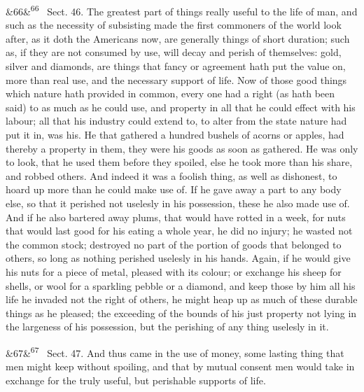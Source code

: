 \documentclass[12pt]{article}
\newcommand{\para}[1][]{\par\noindent\ifx&#1&\else\textsuperscript{\footnotesize #1}~\fi}
\begin{document}
\para[66] Sect. 46. The greatest part of things really useful to the life of man, and such as the necessity of subsisting made the first commoners of the world look after, as it doth the Americans now, are generally things of short duration; such as, if they are not consumed by use, will decay and perish of themselves: gold, silver and diamonds, are things that fancy or agreement hath put the value on, more than real use, and the necessary support of life. Now of those good things which nature hath provided in common, every one had a right (as hath been said) to as much as he could use, and property in all that he could effect with his labour; all that his industry could extend to, to alter from the state nature had put it in, was his. He that gathered a hundred bushels of acorns or apples, had thereby a property in them, they were his goods as soon as gathered. He was only to look, that he used them before they spoiled, else he took more than his share, and robbed others. And indeed it was a foolish thing, as well as dishonest, to hoard up more than he could make use of. If he gave away a part to any body else, so that it perished not uselesly in his possession, these he also made use of. And if he also bartered away plums, that would have rotted in a week, for nuts that would last good for his eating a whole year, he did no injury; he wasted not the common stock; destroyed no part of the portion of goods that belonged to others, so long as nothing perished uselesly in his hands. Again, if he would give his nuts for a piece of metal, pleased with its colour; or exchange his sheep for shells, or wool for a sparkling pebble or a diamond, and keep those by him all his life he invaded not the right of others, he might heap up as much of these durable things as he pleased; the exceeding of the bounds of his just property not lying in the largeness of his possession, but the perishing of any thing uselesly in it.

\para[67] Sect. 47. And thus came in the use of money, some lasting thing that men might keep without spoiling, and that by mutual consent men would take in exchange for the truly useful, but perishable supports of life.
\end{document}
